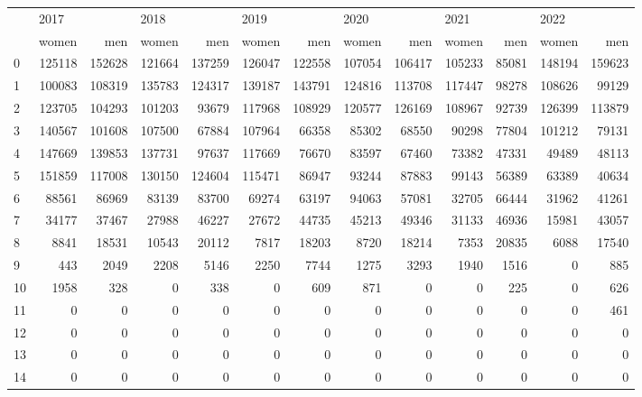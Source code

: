 \begin{tabular}{lrrrrrrrrrrrr}
\toprule
{} & \multicolumn{2}{l}{2017} & \multicolumn{2}{l}{2018} & \multicolumn{2}{l}{2019} & \multicolumn{2}{l}{2020} & \multicolumn{2}{l}{2021} & \multicolumn{2}{l}{2022} \\
{} &   women &     men &   women &     men &   women &     men &   women &     men &   women &    men &   women &     men \\
\midrule
0  &  125118 &  152628 &  121664 &  137259 &  126047 &  122558 &  107054 &  106417 &  105233 &  85081 &  148194 &  159623 \\
1  &  100083 &  108319 &  135783 &  124317 &  139187 &  143791 &  124816 &  113708 &  117447 &  98278 &  108626 &   99129 \\
2  &  123705 &  104293 &  101203 &   93679 &  117968 &  108929 &  120577 &  126169 &  108967 &  92739 &  126399 &  113879 \\
3  &  140567 &  101608 &  107500 &   67884 &  107964 &   66358 &   85302 &   68550 &   90298 &  77804 &  101212 &   79131 \\
4  &  147669 &  139853 &  137731 &   97637 &  117669 &   76670 &   83597 &   67460 &   73382 &  47331 &   49489 &   48113 \\
5  &  151859 &  117008 &  130150 &  124604 &  115471 &   86947 &   93244 &   87883 &   99143 &  56389 &   63389 &   40634 \\
6  &   88561 &   86969 &   83139 &   83700 &   69274 &   63197 &   94063 &   57081 &   32705 &  66444 &   31962 &   41261 \\
7  &   34177 &   37467 &   27988 &   46227 &   27672 &   44735 &   45213 &   49346 &   31133 &  46936 &   15981 &   43057 \\
8  &    8841 &   18531 &   10543 &   20112 &    7817 &   18203 &    8720 &   18214 &    7353 &  20835 &    6088 &   17540 \\
9  &     443 &    2049 &    2208 &    5146 &    2250 &    7744 &    1275 &    3293 &    1940 &   1516 &       0 &     885 \\
10 &    1958 &     328 &       0 &     338 &       0 &     609 &     871 &       0 &       0 &    225 &       0 &     626 \\
11 &       0 &       0 &       0 &       0 &       0 &       0 &       0 &       0 &       0 &      0 &       0 &     461 \\
12 &       0 &       0 &       0 &       0 &       0 &       0 &       0 &       0 &       0 &      0 &       0 &       0 \\
13 &       0 &       0 &       0 &       0 &       0 &       0 &       0 &       0 &       0 &      0 &       0 &       0 \\
14 &       0 &       0 &       0 &       0 &       0 &       0 &       0 &       0 &       0 &      0 &       0 &       0 \\
\bottomrule
\end{tabular}
